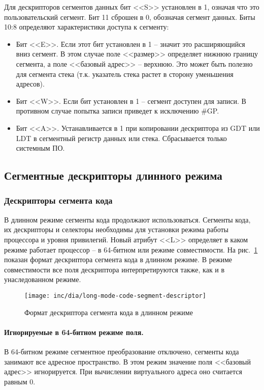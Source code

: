 Для дескрипторов сегментов данных бит <<S>> установлен в 1, означая что это пользовательский сегмент. Бит 11
сброшен в 0, обозначая сегмент данных. Биты 10:8 определяют характеристики доступа к сегменту:
\begin{itemize}
	\item Бит <<E>>. Если этот бит установлен в 1 -- значит это расширяющийся вниз сегмент. В этом случае
		поле <<размер>> определяет нижнюю границу сегмента, а поле <<базовый адрес>> -- верхнюю.
		Это может быть полезно для сегмента стека (т.к. указатель стека растет в сторону уменьшения адресов).
	\item Бит <<W>>. Если бит установлен в 1 -- сегмент доступен для записи. В противном случае попытка записи
		приведет к исключению \#GP.
	\item Бит <<A>>. Устанавливается в 1 при копировании дескриптора из GDT или LDT в сегментный регистр данных или стека.
		Сбрасывается только системным ПО.
\end{itemize}

\subsection{Сегментные дескрипторы длинного режима}
\subsubsection*{Дескрипторы сегмента кода}
В длинном режиме сегменты кода продолжают использоваться. Сегменты кода, их дескрипторы и селекторы
необходимы для установки режима работы процессора и уровня привилегий. Новый атрибут <<L>> определяет в
каком режиме работает процессор -- в 64-битном или режиме совместимости.
На рис.~\ref{fig:long-mode-code-segment-descriptor-format} показан формат дескриптора сегмента кода
в длинном режиме. В режиме совместимости все поля дескриптора интерпретируются также, как и в унаследованном режиме.

\begin{figure}[ht!]
  \centering
  \texttt{[image: inc/dia/long-mode-code-segment-descriptor]}
  \caption{Формат дескриптора сегмента кода в длинном режиме}
  \label{fig:long-mode-code-segment-descriptor-format}
\end{figure}

\paragraph{Игнорируемые в 64-битном режиме поля.}
В 64-битном режиме сегментное преобразование отключено, сегменты кода занимают все адресное пространство.
В этом режим значение поля <<базовый адрес>> игнорируется.
При вычислении виртуального адреса оно считается равным 0.

